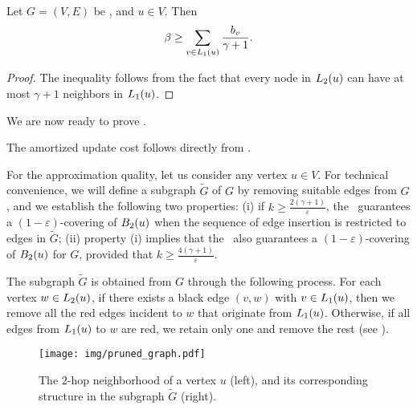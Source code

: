 \begin{lemma}\label{lemma:gamma_ok_properties}
Let $G=(V,E)$ be \gammaok, and $u \in V$. Then
\begin{align*}
     \beta\geq \sum_{v \in L_1(u)} \frac{b_v}{\gamma + 1}.
\end{align*}
\end{lemma}
\begin{proof}
    The inequality  follows from the fact that every node in $L_2(u)$ can have at most $\gamma + 1$ neighbors in $L_1(u)$.  
\end{proof}
  
We are now ready to prove . 


The amortized update cost follows directly from .

For the approximation quality, let us consider any vertex $u \in V$. For technical convenience, we will define a subgraph $\widetilde{G}$ of $G$ by removing suitable edges from $G$, and we establish the following two properties: (i) if $k\ge \frac{2(\gamma+1)}{\varepsilon}$, the \lazyscheme\ guarantees a $(1-\varepsilon)$-covering of $B_2(u)$ when the sequence of edge insertion is restricted to edges in $\widetilde{G}$; (ii) property (i) implies that the \lazyscheme\ also guarantees a $(1-\varepsilon)$-covering of $B_2(u)$ for $G$, provided that $k \geq \frac{4(\gamma+1)}{\varepsilon}$.

The subgraph $\widetilde{G}$ is obtained from $G$ through the following process.
For each vertex $w \in L_2(u)$, if there exists a black edge $(v,w)$ with $v \in L_1(u)$, then we remove all the red edges incident to $w$ that originate from $L_1(u)$.
Otherwise, if all edges from $L_1(u)$ to $w$ are red, we retain only one and remove the rest (see ).

\begin{figure}[h]
    \centering
    \texttt{[image: img/pruned\_graph.pdf]}
    \caption{The $2$-hop neighborhood of a vertex $u$ (left), and its corresponding structure in the subgraph $\widetilde{G}$ (right).}
    \label{fig:pruned_graph}
\end{figure}

